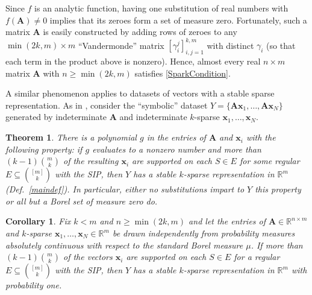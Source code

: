 \documentclass[9pt,twocolumn]{pnas-new}
\newtheorem{theorem}{Theorem}
\newtheorem{corollary}{Corollary}
\begin{document}
Since $f$ is an analytic function, having one substitution of real numbers with $f(\mathbf{A}) \neq 0$ implies that its zeroes form a set of measure zero. Fortunately, such a matrix $\mathbf{A}$ is easily constructed by adding rows of zeroes to any $\min(2k,m) \times m$ ``Vandermonde'' matrix $[\gamma_i^j]_{i,j=1}^{k,m}$ with distinct $\gamma_i$ (so that each term in the product above is nonzero).
Hence, almost every real $n \times m$ matrix $\mathbf{A}$ with $n \geq \min(2k,m)$ satisfies \eqref{SparkCondition}.

A similar phenomenon applies to datasets of vectors with a stable sparse representation. As in \cite[Sec.~IV]{Hillar15}, consider the ``symbolic'' dataset $Y = \{\mathbf{A}\mathbf{x}_1,\ldots,\mathbf{A} \mathbf{x}_N\}$ generated by indeterminate $\mathbf{A}$ and indeterminate $k$-sparse $\mathbf{x}_1, \ldots, \mathbf{x}_N$.  

\begin{theorem}\label{robustPolythm}
There is a polynomial $g$ in the entries of $\mathbf{A}$ and $\mathbf{x}_i$ with the following property:  if $g$ evaluates to a nonzero number and more than \mbox{$(k-1){m \choose k}$} of the resulting $\mathbf{x}_i$ are supported on each $S \in E$ for some regular $E \subseteq {[m] \choose k}$ with the SIP, then $Y$ has a stable $k$-sparse representation in $\mathbb{R}^m$ (Def.~\ref{maindef}). In particular, either no substitutions impart to $Y$ this property or all but a Borel set of measure zero do.
\end{theorem}

\begin{corollary}\label{ProbabilisticCor}
Fix $k < m$ and $n \geq \min(2k, m)$ %
and let the entries of $\mathbf{A} \in \mathbb{R}^{n \times m}$ and $k$-sparse $\mathbf{x}_1, \ldots, \mathbf{x}_N \in \mathbb{R}^m$ be drawn independently from probability measures absolutely continuous with respect to the standard Borel measure $\mu$. If more than $(k-1){m \choose k}$ of the vectors $\mathbf{x}_i$ are supported on each $S \in E$ for a regular $E \subseteq {[m] \choose k}$ with the SIP, then $Y$ has a stable $k$-sparse representation in $\mathbb{R}^m$ with probability one.
\end{corollary}
\end{document}
